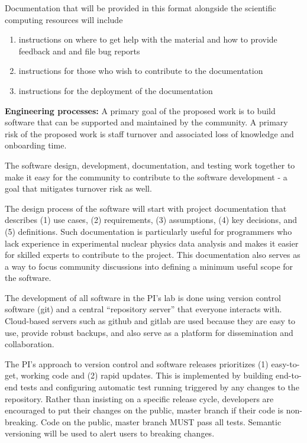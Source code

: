 Documentation that will be provided in this format alongside the scientific computing resources will include

\begin{enumerate}
    \item instructions on where to get help with the material and how to provide feedback and and file bug reports
    \item instructions for those who wish to contribute to the documentation
    \item instructions for the deployment of the documentation
\end{enumerate}


\textbf{Engineering processes:}
A primary goal of the proposed work is to build software that can be supported and maintained by the community.  A primary risk of the proposed work is staff turnover and associated loss of knowledge and onboarding time.

The software design, development, documentation, and testing work together to make it easy for the community to contribute to the software development - a goal that mitigates turnover risk as well.

The design process of the software will start with project documentation that describes (1) use cases, (2) requirements, (3) assumptions, (4) key decisions, and (5) definitions.  Such documentation is particularly useful for programmers who lack experience in experimental nuclear physics data analysis and makes it easier for skilled experts to contribute to the project.  This documentation also serves as a way to focus community discussions into defining a minimum useful scope for the software.

The development of all software in the PI's lab is done using version control software (git) and a central ``repository server'' that everyone interacts with.  Cloud-based servers such as github and gitlab are used because they are easy to use, provide robust backups, and also serve as a platform for dissemination and collaboration.

The PI's approach to version control and software releases prioritizes (1) easy-to-get, working code and (2) rapid updates.  This is implemented by building end-to-end tests and configuring automatic test running triggered by any changes to the repository.  Rather than insisting on a specific release cycle, developers are encouraged to put their changes on the public, master branch if their code is non-breaking.  Code on the public, master branch MUST pass all tests.  Semantic versioning will be used to alert users to breaking changes.

